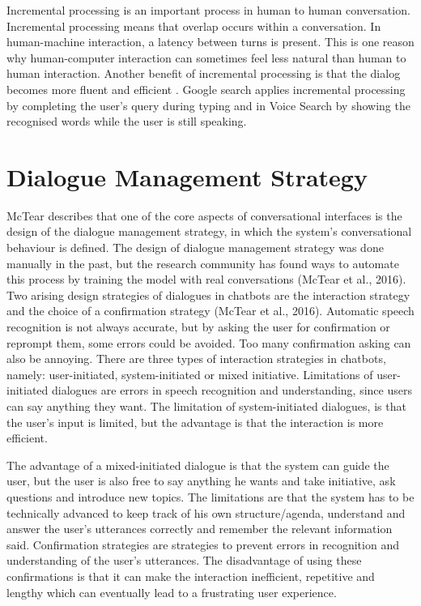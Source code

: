 Incremental processing is an important process in human to human conversation. Incremental processing means that overlap occurs within a conversation. In human-machine interaction, a latency between turns is present. This is one reason why human-computer interaction can sometimes feel less natural than human to human interaction. Another benefit of incremental processing is that the dialog becomes more fluent and efficient \cite{mctear2016}. Google search applies incremental processing by completing the user’s query during typing and in Voice Search by showing the recognised words while the user is still speaking.




\section{Dialogue Management Strategy} %

McTear \cite{mctear2016} describes that one of the core aspects of conversational interfaces is the design of the dialogue management strategy, in which the system’s conversational behaviour is defined. The design of dialogue management strategy was done manually in the past, but the research community has found ways to automate this process by training the model with real conversations (McTear et al., 2016). Two arising design strategies of dialogues in chatbots are the interaction strategy and the choice of a confirmation strategy (McTear et al., 2016). Automatic speech recognition is not always accurate, but by asking the user for confirmation or reprompt them, some errors could be avoided. Too many confirmation asking can also be annoying. There are three types of interaction strategies in chatbots, namely: user-initiated, system-initiated or mixed initiative. Limitations of user-initiated dialogues are errors in speech recognition and understanding, since users can say anything they want. The limitation of system-initiated dialogues, is that the user’s input is limited, but the advantage is that the interaction is more efficient. 

The advantage of a mixed-initiated dialogue is that the system can guide the user, but the user is also free to say anything he wants and take initiative, ask questions and introduce new topics. The limitations are that the system has to be technically advanced to keep track of his own structure/agenda, understand and answer the user’s utterances correctly and remember the relevant information said. Confirmation strategies are strategies to prevent errors in recognition and understanding of the user’s utterances. The disadvantage of using these confirmations is that it can make the interaction inefficient, repetitive and lengthy which can eventually lead to a frustrating user experience. 

